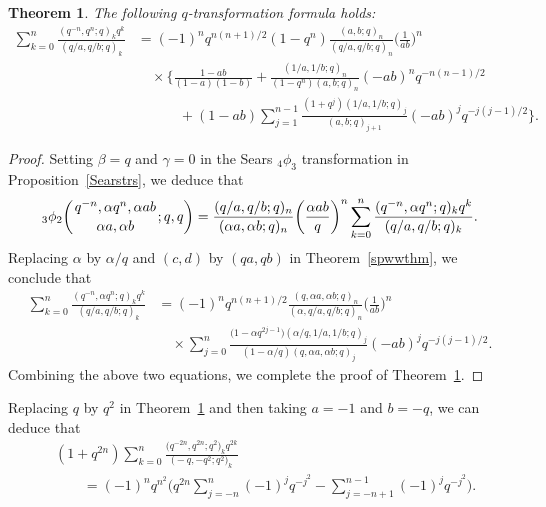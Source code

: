 \documentclass[pdftex]{sigma}
\numberwithin{equation}{section}
\newtheorem{Theorem}{Theorem}[section]
\begin{document}
\begin{Theorem} \label{watliuthm} The following $q$-transformation formula holds:
	\begin{align*}%
 \sum_{k=0}^n \frac{(q^{-n}, q^n; q)_k q^k}{(q/a, q/b; q)_k}
		&{}=(-1)^n q^{n(n+1)/2} (1-q^n) \frac{(a, b; q)_n}{(q/a, q/b; q)_n}\biggl(\frac{1}{ab}\biggr)^n\nonumber\\
		&\quad{} \times \Biggl\{\frac{1-ab}{(1-a)(1-b)}+\frac{(1/a, 1/b; q)_n}
		{(1-q^n)(a, b; q)_n} (-ab)^n q^{-n(n-1)/2} \nonumber\\
		&\qquad\quad{}+(1-ab)\sum_{j=1}^{n-1} \frac{(1+q^j) (1/a, 1/b; q)_j}{ (a, b; q)_{j+1}} (-ab)^j q^{-j(j-1)/2}\Biggr\}.\nonumber
	\end{align*}		
\end{Theorem}
\begin{proof}
	Setting $\beta=q$ and $\gamma=0$ in the Sears $_4\phi_3$ transformation in Proposition~\ref{Searstrs}, we deduce that
	\begin{equation*}%
		{_3 \phi_2} \biggl({{q^{-n}, \alpha q^n, \alpha ab}
			\atop{\alpha a, \alpha b}}; q, q\biggr)
		=\frac{(q/a, q/b; q)_n}{(\alpha a, \alpha b; q)_n}
		\biggl(\frac{\alpha ab}{q}\biggr)^n
		\sum_{k=0}^n \frac{(q^{-n}, \alpha q^n; q)_k q^k}{(q/a, q/b; q)_k}.
	\end{equation*}
Replacing $\alpha$ by $\alpha/q$ and $(c, d)$ by $(qa, qb)$ in Theorem~\ref{spwwthm}, we conclude that
\begin{align*}%
	\sum_{k=0}^n \frac{(q^{-n}, \alpha q^n; q)_k q^k}{(q/a, q/b; q)_k}
	&{}=(-1)^n q^{n(n+1)/2} \frac{(q, \alpha a, \alpha b; q)_n}{(\alpha, q/a, q/b; q)_n}\biggl(\frac{1}{ab}\biggr)^n\\
	&\quad{}\times \sum_{j=0}^n \frac{\bigl(1-\alpha q^{2j-1}\bigr) (\alpha/q, 1/a, 1/b; q)_j}{(1-\alpha/q) (q, \alpha a, \alpha b; q)_j} (-ab)^j q^{-j(j-1)/2}.\nonumber
\end{align*}	
Combining the above two equations, we complete the proof of Theorem~\ref{watliuthm}.
\end{proof}

Replacing $q$ by $q^2$ in Theorem~\ref{watliuthm} and then taking $a=-1$ and $b=-q$, we can deduce that
\begin{align}
 &(1+q^{2n})	\sum_{k=0}^n \frac{\bigl(q^{-2n}, q^{2n}; q^2\bigr)_k q^{2k}}{\bigl(-q, -q^2; q^2\bigr)_k}\nonumber\\
&\qquad{}=(-1)^n q^{n^2}\Biggl(q^{2n}\sum_{j=-n}^n (-1)^j q^{-j^2}-\sum_{j=-n+1}^{n-1}(-1)^j q^{-j^2}\Biggr).\label{spvalue:eqn11}
\end{align}
\end{document}
